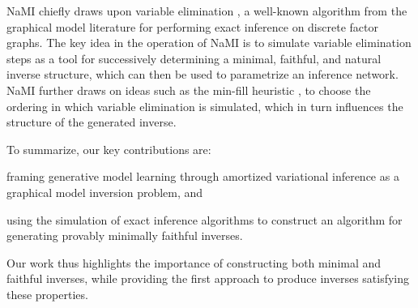 NaMI chiefly draws upon variable elimination \citep[Ch 9,10]{KollerFriedman2009}, a well-known algorithm from the graphical model literature for performing exact inference on discrete factor graphs.
The key idea in the operation of NaMI is to simulate variable elimination steps as a tool for successively determining a minimal, faithful, and natural inverse structure, which can then be used to parametrize an inference network.
NaMI further draws on ideas such as the min-fill heuristic \citep{FishelsonGeiger2004}, to choose the ordering in which variable elimination is simulated, which in turn influences the structure of the generated inverse.

To summarize, our key contributions are:
%
\begin{compactenum}[i)]
\item framing generative model learning through amortized variational inference as a graphical model inversion problem, and
\item using the simulation of exact inference algorithms to construct an algorithm for generating provably minimally faithful inverses.
\end{compactenum}
%
Our work thus highlights the importance of constructing both minimal and faithful inverses, while providing the first approach to produce inverses satisfying these properties.

